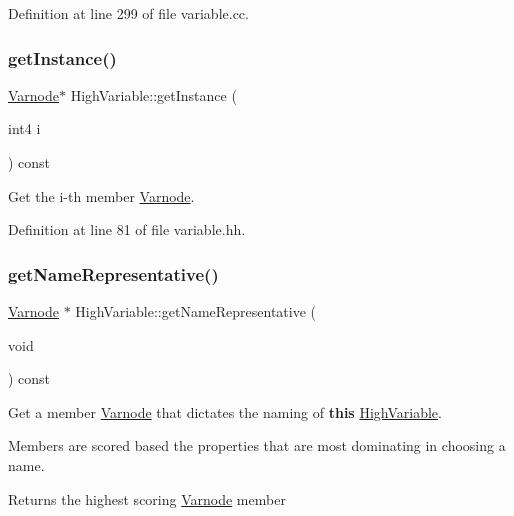 Definition at line 299 of file variable.\+cc.

\mbox{\label{class_high_variable_a68574ef0c95bc66f499dd88844e5f728}} 
\subsubsection{\texorpdfstring{getInstance()}{getInstance()}}
{\footnotesize\ttfamily \mbox{\hyperlink{class_varnode}{Varnode}}$\ast$ High\+Variable\+::get\+Instance (\begin{DoxyParamCaption}\item[{int4}]{i }\end{DoxyParamCaption}) const\hspace{0.3cm}{\ttfamily [inline]}}



Get the i-\/th member \mbox{\hyperlink{class_varnode}{Varnode}}. 



Definition at line 81 of file variable.\+hh.

\mbox{\label{class_high_variable_ae462825b47ce6f0b17b1b40ec63dd904}} 
\subsubsection{\texorpdfstring{getNameRepresentative()}{getNameRepresentative()}}
{\footnotesize\ttfamily \mbox{\hyperlink{class_varnode}{Varnode}} $\ast$ High\+Variable\+::get\+Name\+Representative (\begin{DoxyParamCaption}\item[{void}]{ }\end{DoxyParamCaption}) const}



Get a member \mbox{\hyperlink{class_varnode}{Varnode}} that dictates the naming of {\bfseries{this}} \mbox{\hyperlink{class_high_variable}{High\+Variable}}. 

Members are scored based the properties that are most dominating in choosing a name. \begin{DoxyReturn}{Returns}
the highest scoring \mbox{\hyperlink{class_varnode}{Varnode}} member 
\end{DoxyReturn}


